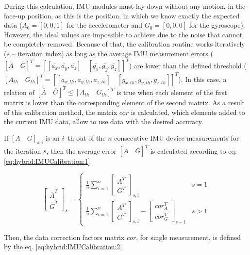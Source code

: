 \documentclass[sensors,article,submit,moreauthors,pdftex,10pt,a4paper]{mdpi}
\begin{document}
	During this calculation, IMU modules must lay down without any motion, in the face-up position, as this is the position, in which we know exactly the expected data ($A_0=[0,0,1]$ for the accelerometer and $G_0=[0,0,0]$ for the gyroscope). However, the ideal values are impossible to achieve due to the noise that cannot be completely removed. Because of that, the calibration routine works iteratively ($s$ -- iteration index) as long as the average IMU measurement errors ($[\overline{A}\quad \overline{G}]^T = [[\overline{a_x},\overline{a_y},\overline{a_z}]\quad[\overline{g_x},\overline{g_y},\overline{g_z}]]^T$) are lower than the defined threshold ($[A_{th}\quad G_{th}]^T = [[a_{x,th},a_{y,th},a_{z,th}]\quad[g_{x,th},g_{y,th},g_{z,th}]]^T$). In this case, a relation of $[\overline{A}\quad \overline{G}]^T \le [A_{th}\quad G_{th}]^T$ is true when each element of the first matrix is lower than the corresponding element of the second matrix. As a result of this calibration method, the matrix $cor$ is calculated, which elements added to the current IMU data, allow to use data with the desired accuracy. 
		
	If $[A\quad G]_{s,i}$ is an $i$--th out of the $n$ consecutive IMU device measurements for the iteration $s$, then the average error $[\overline{A}\quad \overline{G}]^T$ is calculated according to eq. \ref{eq:hybrid:IMUCalibration:1}.
		
	\begin{equation}
		\begin{bmatrix} \bar{A}^T \\ \bar{G}^T \end{bmatrix}_s =
		\begin{cases}
			\frac{1}{n}\sum_{i=1}^{n}{\begin{bmatrix}A^T \\ G^T\end{bmatrix}_{s,i}} & s = 1\\
			\frac{1}{n}\sum_{i=1}^{n}{\begin{bmatrix}A^T \\ G^T\end{bmatrix}_{s,i} - \begin{bmatrix}cor_A^T\\ cor_G^T\end{bmatrix}_{s-1}} &  s > 1
		\end{cases}
		\label{eq:hybrid:IMUCalibration:1}
	\end{equation}
	
	Then, the data correction factors matrix $cor$, for single measurement, is defined by the eq. \ref{eq:hybrid:IMUCalibration:2}
		
\end{document}
